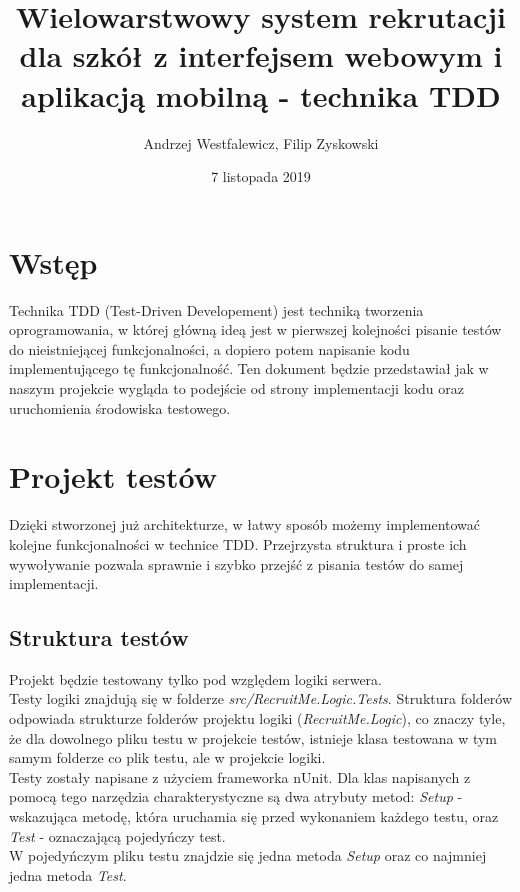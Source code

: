 \documentclass{article}
\title{Wielowarstwowy system rekrutacji dla szkół z interfejsem webowym i aplikacją mobilną - technika TDD}
\author{Andrzej Westfalewicz, Filip Zyskowski}
\date{7 listopada 2019}
\begin{document}
\begin{titlepage}
\maketitle
\end{titlepage}

\pagebreak

\section{Wstęp}

Technika TDD (Test-Driven Developement) jest techniką tworzenia oprogramowania, w której główną ideą jest w pierwszej kolejności pisanie testów do nieistniejącej funkcjonalności, a dopiero potem napisanie kodu implementującego tę funkcjonalność. Ten dokument będzie przedstawiał jak w naszym projekcie wygląda to podejście od strony implementacji kodu oraz uruchomienia środowiska testowego.

\section{Projekt testów}
Dzięki stworzonej już architekturze, w łatwy sposób możemy implementować kolejne funkcjonalności w technice TDD. Przejrzysta struktura i proste ich wywoływanie pozwala sprawnie i szybko przejść z pisania testów do samej implementacji.

\subsection{Struktura testów}
Projekt będzie testowany tylko pod względem logiki serwera. \\
Testy logiki znajdują się w folderze \emph{src/RecruitMe.Logic.Tests}. Struktura folderów odpowiada strukturze folderów projektu logiki (\emph{RecruitMe.Logic}), co znaczy tyle, że dla dowolnego pliku testu w projekcie testów, istnieje klasa testowana w tym samym folderze co plik testu, ale w projekcie logiki. \\

Testy zostały napisane z użyciem frameworka nUnit. Dla klas napisanych z pomocą tego narzędzia charakterystyczne są dwa atrybuty metod: \emph{Setup} - wskazująca metodę, która uruchamia się przed wykonaniem każdego testu, oraz \emph{Test} - oznaczającą pojedyńczy test. \\
W pojedyńczym pliku testu znajdzie się jedna metoda \emph{Setup} oraz co najmniej jedna metoda \emph{Test}.
\end{document}
